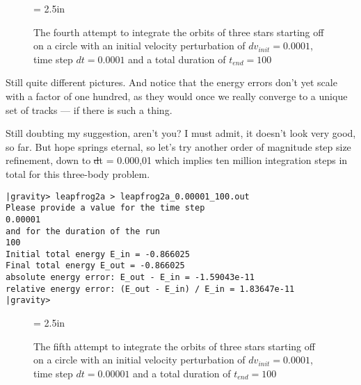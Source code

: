 \begin{figure}[htb]
\begin{center}
\epsfxsize = 2.5in
\caption[Three stars on a circle, leapfrog, $dv_{init}=0.0001$, $dt = 0.0001$,
$t_{end} = 100$]
{The fourth attempt to integrate the orbits of three stars
starting off on a circle with an initial velocity perturbation of 
$dv_{init}=0.0001$, time step $dt = 0.0001$ and a total duration of
$t_{end} = 100$}
\label{fig:leap2a-0.0001-100}
\end{center}
\end{figure}

\abc

\bob
Still quite different pictures.  And notice that the energy errors
don't yet scale with a factor of one hundred, as they would once we
really converge to a unique set of tracks --- if there is such a thing.

\alice
Still doubting my suggestion, aren't you?  I must admit, it doesn't
look very good, so far.  But hope springs eternal, so let's try
another order of magnitude step size refinement, down to {\st dt =
0.000,01} which implies ten million integration steps in total for
this three-body problem.

\cba

\begin{small}
\begin{verbatim}
|gravity> leapfrog2a > leapfrog2a_0.00001_100.out
Please provide a value for the time step
0.00001
and for the duration of the run
100
Initial total energy E_in = -0.866025
Final total energy E_out = -0.866025
absolute energy error: E_out - E_in = -1.59043e-11
relative energy error: (E_out - E_in) / E_in = 1.83647e-11
|gravity>
\end{verbatim}
\end{small}

\begin{figure}[htb]
\begin{center}
\epsfxsize = 2.5in
\caption[Three stars on a circle, leapfrog, $dv_{init}=0.0001$, $dt = 0.00001$,
$t_{end} = 100$]
{The fifth attempt to integrate the orbits of three stars
starting off on a circle with an initial velocity perturbation of 
$dv_{init}=0.0001$, time step $dt = 0.00001$ and a total duration of
$t_{end} = 100$}
\label{fig:leap2a-0.00001-100}
\end{center}
\end{figure}

\abc


